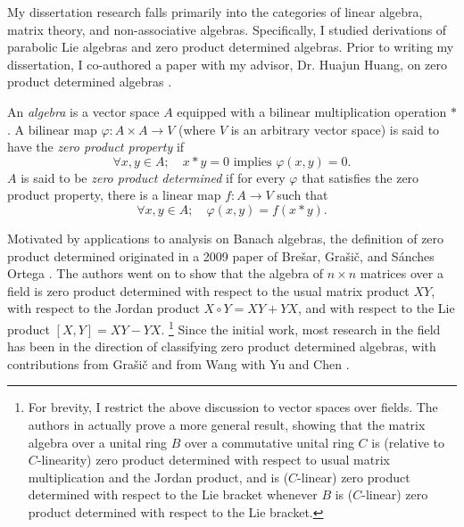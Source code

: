 \documentclass[11pt]{article}
\begin{document}

\makeletterhead

\maketitle

\vfill

My dissertation research falls primarily into the categories of linear
algebra, matrix theory, and non-associative algebras. Specifically,
I studied derivations of parabolic Lie algebras and zero product
determined algebras. Prior to writing my dissertation, I co-authored a
paper with my advisor, Dr. Huajun Huang, on zero product determined
algebras \cite{article:brice2015zero}.



An \emph{algebra} is a vector space $A$ equipped with a bilinear
multiplication operation $\ast$. A bilinear map
$\varphi : A \times A \to V$ (where $V$ is an arbitrary vector space)
is said to have the \emph{zero product property} if
\[
  \forall x, y \in A;\quad
  x \ast y = 0 \text{ implies } \varphi(x,y) = 0
  \text{.}
\]
$A$ is said to be \emph{zero product determined} if for every $\varphi$
that satisfies the zero product property, there is a linear map
$f : A \to V$ such that
\[
  \forall x, y \in A;\quad
  \varphi(x,y) = f(x \ast y)
  \text{.}
\]

Motivated by applications to analysis on Banach algebras, the definition
of zero product determined originated in a 2009 paper of Bre\v{s}ar,
Gra\v{s}i\v{c}, and S\'{a}nches Ortega \cite{brevsar2009zero}.
The authors went on to show that the algebra of $n \times n$ matrices
over a field is zero product determined with respect to the usual matrix
product $XY$, with respect to the Jordan product $X \circ Y = XY + YX$,
and with respect to the Lie product $[X,Y] = XY - YX$.
\footnote{For brevity, I restrict the above discussion to vector spaces
over fields. The authors in \cite{brevsar2009zero} actually prove a more
general result, showing that the matrix algebra over a unital ring $B$
over a commutative unital ring $C$ is (relative to $C$-linearity) zero
product determined with respect to usual matrix multiplication and the
Jordan product, and is ($C$-linear) zero product determined with respect
to the Lie bracket whenever $B$ is ($C$-linear) zero product determined
with respect to the Lie bracket.}
Since the initial work, most research in the field has been in the
direction of classifying zero product determined algebras,
with contributions from Gra\v{s}i\v{c} \cite{gravsivc2010zero}
and from Wang with Yu and Chen \cite{wang2011class}.
\end{document}
